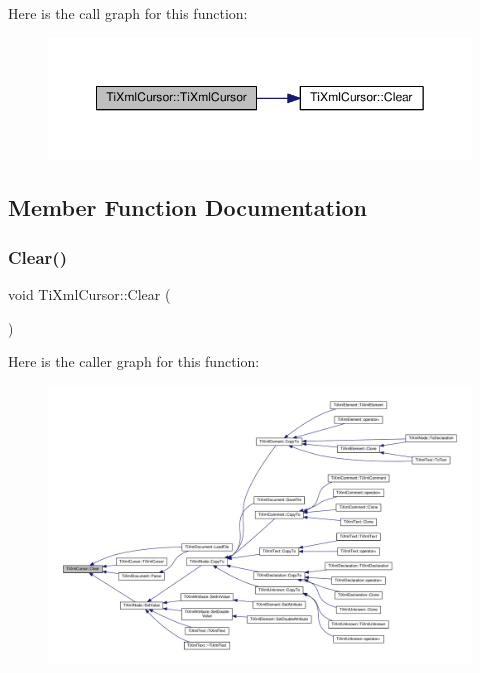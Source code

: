 Here is the call graph for this function\+:\nopagebreak
\begin{figure}[H]
\begin{center}
\leavevmode
\includegraphics[width=349pt]{struct_ti_xml_cursor_a7ad233928a675f0271eb440b150e3ff1_cgraph}
\end{center}
\end{figure}


\subsection{Member Function Documentation}
\mbox{\label{struct_ti_xml_cursor_a1e6fa622b59dafb71b6efe595105dcdd}} 
\subsubsection{\texorpdfstring{Clear()}{Clear()}}
{\footnotesize\ttfamily void Ti\+Xml\+Cursor\+::\+Clear (\begin{DoxyParamCaption}{ }\end{DoxyParamCaption})\hspace{0.3cm}{\ttfamily [inline]}}

Here is the caller graph for this function\+:\nopagebreak
\begin{figure}[H]
\begin{center}
\leavevmode
\includegraphics[width=350pt]{struct_ti_xml_cursor_a1e6fa622b59dafb71b6efe595105dcdd_icgraph}
\end{center}
\end{figure}


